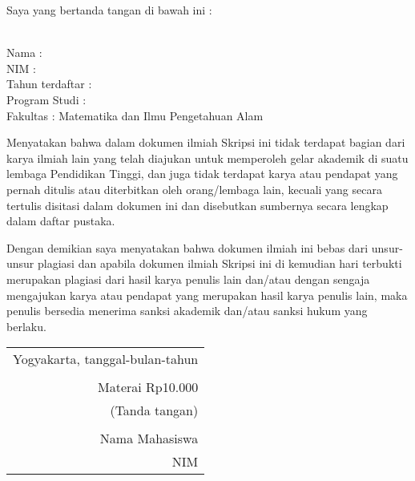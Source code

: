 \noindent Saya yang bertanda tangan di bawah ini :

\vspace{-1em}

\begin{tabbing}
\hspace{40mm} \= \\ %
\noindent Nama \> : \\[\parskip]
\noindent NIM \> :  \\[\parskip]
\noindent Tahun terdaftar \> :  \\[\parskip]
\noindent Program Studi \> :  \\[\parskip]
\noindent Fakultas \> : Matematika dan Ilmu Pengetahuan Alam
\end{tabbing}

\noindent Menyatakan bahwa dalam dokumen ilmiah Skripsi ini tidak terdapat bagian dari karya ilmiah lain yang telah diajukan untuk memperoleh gelar akademik di suatu lembaga Pendidikan Tinggi, dan juga tidak terdapat karya atau pendapat yang pernah ditulis atau diterbitkan oleh orang/lembaga lain, kecuali yang secara tertulis disitasi dalam dokumen ini dan disebutkan sumbernya secara lengkap dalam daftar pustaka.

\noindent Dengan demikian saya menyatakan bahwa dokumen ilmiah ini bebas dari unsur-unsur plagiasi dan apabila dokumen ilmiah Skripsi ini di kemudian hari terbukti merupakan plagiasi dari hasil karya penulis lain dan/atau dengan sengaja mengajukan karya atau pendapat yang merupakan hasil karya penulis lain, maka penulis bersedia menerima sanksi akademik dan/atau sanksi hukum yang berlaku.


\begin{flushright}
	\begin{tabular}{r}
		Yogyakarta, tanggal-bulan-tahun \\
		\vspace{0.1cm} \\
		\tiny{Materai Rp10.000} \\
		\tiny{(Tanda tangan)} \\	
		\vspace{0.1cm} \\
		Nama Mahasiswa \\ NIM
	\end{tabular}
\end{flushright}